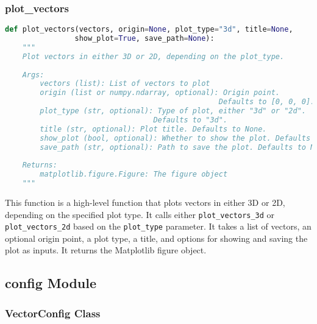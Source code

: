 \subsubsection{plot\_vectors}

\begin{lstlisting}[language=Python]
def plot_vectors(vectors, origin=None, plot_type="3d", title=None, 
                show_plot=True, save_path=None):
    """
    Plot vectors in either 3D or 2D, depending on the plot_type.
    
    Args:
        vectors (list): List of vectors to plot
        origin (list or numpy.ndarray, optional): Origin point. 
                                                 Defaults to [0, 0, 0].
        plot_type (str, optional): Type of plot, either "3d" or "2d". 
                                  Defaults to "3d".
        title (str, optional): Plot title. Defaults to None.
        show_plot (bool, optional): Whether to show the plot. Defaults to True.
        save_path (str, optional): Path to save the plot. Defaults to None.
        
    Returns:
        matplotlib.figure.Figure: The figure object
    """
\end{lstlisting}

This function is a high-level function that plots vectors in either 3D or 2D, depending on the specified plot type. It calls either \texttt{plot\_vectors\_3d} or \texttt{plot\_vectors\_2d} based on the \texttt{plot\_type} parameter. It takes a list of vectors, an optional origin point, a plot type, a title, and options for showing and saving the plot as inputs. It returns the Matplotlib figure object.

\subsection{config Module}

\subsubsection{VectorConfig Class}

